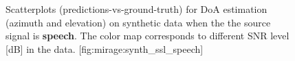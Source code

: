 \begin{figure}[h]
    \begin{sidecaption}[]{
        Scatterplots (predictions-vs-ground-truth) for DoA estimation (azimuth and elevation) on synthetic data when the the source signal is \textbf{speech}.
        The color map corresponds to different SNR level [dB] in the data.
    }[fig:mirage:synth_ssl_speech]
    \centering
    \hfill
    \end{sidecaption}
\end{figure}

